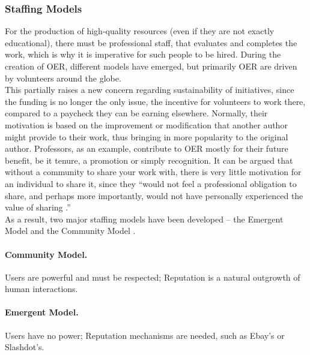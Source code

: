 \documentclass[a4paper]{article}
\begin{document}
\subsubsection{Staffing Models}

For the production of high-quality resources (even if they are not exactly educational), there must be professional staff, that evaluates and completes the work, which is why it is imperative for such people to be hired. During the creation of OER, different models have emerged, but primarily OER are driven by volunteers around the globe. \\

\noindent
This partially raises a new concern regarding sustainability of initiatives, since the funding is no longer the only issue, the incentive for volunteers to work there, compared to a paycheck they can be earning elsewhere. Normally, their motivation is based on the improvement or modification that another author might provide to their work, thus bringing in more popularity to the original author. Professors, as an example, contribute to OER mostly for their future benefit, be it tenure, a promotion or simply recognition. It can be argued that without a community to share your work with, there is very little motivation for an individual to share it, since they ``would not feel a professional obligation to share, and perhaps more importantly, would not have personally experienced the value of sharing \cite[p.39]{sustain}.'' \\

\noindent
As a result, two major staffing models have been developed -- the Emergent Model and the Community Model \cite{sustain}. 
\paragraph{Community Model.} Users are powerful and must be respected; Reputation is a natural outgrowth of human interactions.
\paragraph{Emergent Model.} Users have no power; Reputation mechanisms are needed, such as Ebay's or Slashdot's. \\
\end{document}
